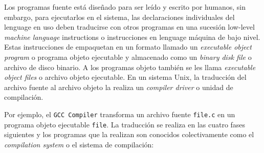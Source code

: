 Los programas fuente está diseñado para ser leído y escrito por humanos, sin embargo, para ejecutarlos en el sistema, las declaraciones individuales del lenguage en uso deben traducirse con otros programas en una sucesión low-level \textit{machine language} instructions o instrucciones en lenguage máquina de bajo nivel. Estas instrucciones de empaquetan en un formato llamado un \textit{executable object program} o programa objeto ejecutable y almacenado como un \textit{binary disk file} o archivo de disco binario. A los programas objeto también se les llama \textit{executable object files} o archivo objeto ejecutable. En un sistema Unix, la traducción del archivo fuente al archivo objeto la realiza un \textit{compiler driver} o unidad de compilación. 
\bigskip

Por ejemplo, el \texttt{GCC Compiler} transforma un archivo fuente \texttt{file.c} en un programa objeto ejecutable \texttt{file}. La traducción se realiza en las cuatro fases siguientes y los programas que la realizan son conocidos colectivamente como el \textit{compilation system} o el sistema de compilación:

